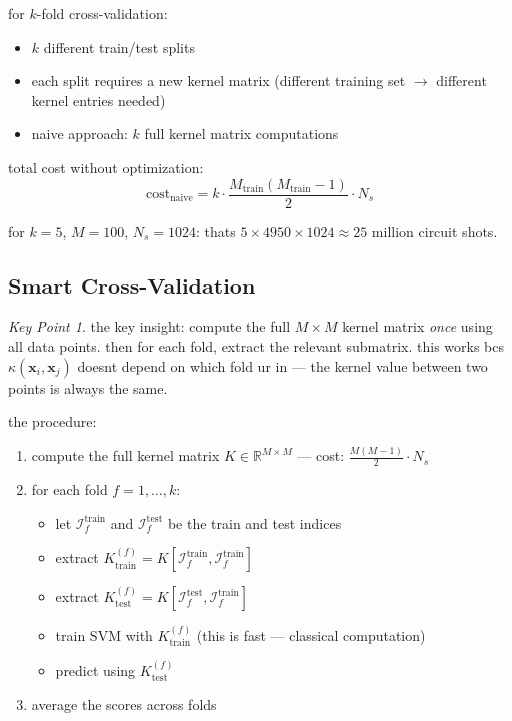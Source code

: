 \documentclass[11pt,a4paper]{article}
\theoremstyle{definition}
\theoremstyle{remark}
\newtheorem*{keypoint}{Key Point}
\begin{document}
for $k$-fold cross-validation:
\begin{itemize}[leftmargin=*]
    \item $k$ different train/test splits
    \item each split requires a new kernel matrix (different training set $\to$ different kernel entries needed)
    \item naive approach: $k$ full kernel matrix computations
\end{itemize}

total cost without optimization:
\[
\text{cost}_{\text{naive}} = k \cdot \frac{M_{\text{train}}(M_{\text{train}} - 1)}{2} \cdot N_s
\]

for $k = 5$, $M = 100$, $N_s = 1024$: thats $5 \times 4950 \times 1024 \approx 25$ million circuit shots.

\subsection{Smart Cross-Validation}

\begin{keypoint}
the key insight: compute the full $M \times M$ kernel matrix \emph{once} using all data points. then for each fold, extract the relevant submatrix. this works bcs $\kappa(\mathbf{x}_i, \mathbf{x}_j)$ doesnt depend on which fold ur in --- the kernel value between two points is always the same.
\end{keypoint}

the procedure:
\begin{enumerate}[leftmargin=*]
    \item compute the full kernel matrix $K \in \mathbb{R}^{M \times M}$ --- cost: $\frac{M(M-1)}{2} \cdot N_s$
    \item for each fold $f = 1, \ldots, k$:
    \begin{itemize}[leftmargin=*]
        \item let $\mathcal{I}_f^{\text{train}}$ and $\mathcal{I}_f^{\text{test}}$ be the train and test indices
        \item extract $K_{\text{train}}^{(f)} = K[\mathcal{I}_f^{\text{train}}, \mathcal{I}_f^{\text{train}}]$
        \item extract $K_{\text{test}}^{(f)} = K[\mathcal{I}_f^{\text{test}}, \mathcal{I}_f^{\text{train}}]$
        \item train SVM with $K_{\text{train}}^{(f)}$ (this is fast --- classical computation)
        \item predict using $K_{\text{test}}^{(f)}$
    \end{itemize}
    \item average the scores across folds
\end{enumerate}
\end{document}
